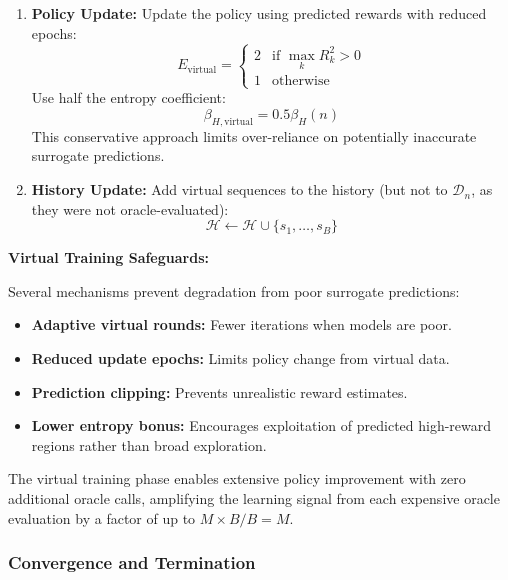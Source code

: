 \documentclass[conference]{IEEEtran}
\begin{document}
\begin{enumerate}
    \item \textbf{Policy Update:} Update the policy using predicted rewards with reduced epochs:
    \begin{equation}
    E_{\text{virtual}} = \begin{cases}
    2 & \text{if } \max_k R^2_k > 0 \\
    1 & \text{otherwise}
    \end{cases}
    \end{equation}
    Use half the entropy coefficient:
    \begin{equation}
    \beta_{H,\text{virtual}} = 0.5 \beta_H(n)
    \end{equation}
    This conservative approach limits over-reliance on potentially inaccurate surrogate predictions.
    
    \item \textbf{History Update:} Add virtual sequences to the history (but not to $\mathcal{D}_n$, as they were not oracle-evaluated):
    \begin{equation}
    \mathcal{H} \leftarrow \mathcal{H} \cup \{s_1, \ldots, s_B\}
    \end{equation}
\end{enumerate}

\textbf{Virtual Training Safeguards:}

Several mechanisms prevent degradation from poor surrogate predictions:
\begin{itemize}
    \item \textbf{Adaptive virtual rounds:} Fewer iterations when models are poor.
    \item \textbf{Reduced update epochs:} Limits policy change from virtual data.
    \item \textbf{Prediction clipping:} Prevents unrealistic reward estimates.
    \item \textbf{Lower entropy bonus:} Encourages exploitation of predicted high-reward regions rather than broad exploration.
\end{itemize}

The virtual training phase enables extensive policy improvement with zero additional oracle calls, amplifying the learning signal from each expensive oracle evaluation by a factor of up to $M \times B / B = M$.

\subsubsection{Convergence and Termination}
\end{document}
